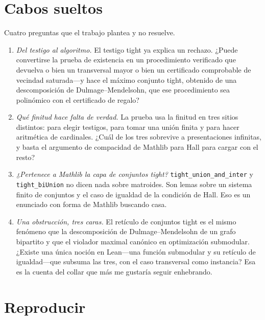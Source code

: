 \documentclass[11pt]{article}
\newcommand{\lean}[1]{\texttt{#1}}
\begin{document}
\section{Cabos sueltos}\label{sec:questions}

Cuatro preguntas que el trabajo plantea y no resuelve.

\begin{enumerate}\itemsep3pt
\item \emph{Del testigo al algoritmo.} El testigo tight ya explica un rechazo. ¿Puede convertirse la
prueba de existencia en un procedimiento verificado que devuelva o bien un transversal mayor o bien
un certificado comprobable de vecindad saturada---y hace el máximo conjunto tight, obtenido de una
descomposición de Dulmage--Mendelsohn, que ese procedimiento sea polinómico con el certificado de
regalo?
\item \emph{Qué finitud hace falta de verdad.} La prueba usa la finitud en tres sitios distintos:
para elegir testigos, para tomar una unión finita y para hacer aritmética de cardinales. ¿Cuál de
los tres sobrevive a presentaciones infinitas, y basta el argumento de compacidad de Mathlib para
Hall para cargar con el resto?
\item \emph{¿Pertenece a Mathlib la capa de conjuntos tight?} \lean{tight\_union\_and\_inter} y
\lean{tight\_biUnion} no dicen nada sobre matroides. Son lemas sobre un sistema finito de conjuntos
y el caso de igualdad de la condición de Hall. Eso es un enunciado con forma de Mathlib buscando
casa.
\item \emph{Una obstrucción, tres caras.} El retículo de conjuntos tight es el mismo fenómeno que la
descomposición de Dulmage--Mendelsohn de un grafo bipartito y que el violador maximal canónico en
optimización submodular. ¿Existe una única noción en Lean---una función submodular y su retículo de
igualdad---que subsuma las tres, con el caso transversal como instancia? Esa es la cuenta del collar
que más me gustaría seguir enhebrando.
\end{enumerate}

\section*{Reproducir}
\end{document}
